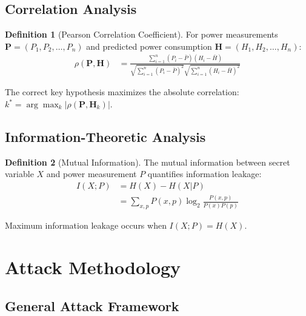 \documentclass[11pt,a4paper]{article}
\theoremstyle{definition}
\newtheorem{definition}{Definition}[section]
\begin{document}
\subsection{Correlation Analysis}

\begin{definition}[Pearson Correlation Coefficient]
For power measurements $\mathbf{P} = (P_1, P_2, \ldots, P_n)$ and predicted power consumption $\mathbf{H} = (H_1, H_2, \ldots, H_n)$:
\begin{align}
\rho(\mathbf{P}, \mathbf{H}) &= \frac{\sum_{i=1}^n (P_i - \bar{P})(H_i - \bar{H})}{\sqrt{\sum_{i=1}^n (P_i - \bar{P})^2} \sqrt{\sum_{i=1}^n (H_i - \bar{H})^2}}
\end{align}

The correct key hypothesis maximizes the absolute correlation: $k^* = \arg\max_k |\rho(\mathbf{P}, \mathbf{H}_k)|$.
\end{definition}

\subsection{Information-Theoretic Analysis}

\begin{definition}[Mutual Information]
The mutual information between secret variable $X$ and power measurement $P$ quantifies information leakage:
\begin{align}
I(X; P) &= H(X) - H(X|P) \\
&= \sum_{x,p} P(x,p) \log_2 \frac{P(x,p)}{P(x)P(p)}
\end{align}

Maximum information leakage occurs when $I(X; P) = H(X)$.
\end{definition}

\section{Attack Methodology}

\subsection{General Attack Framework}
\end{document}
